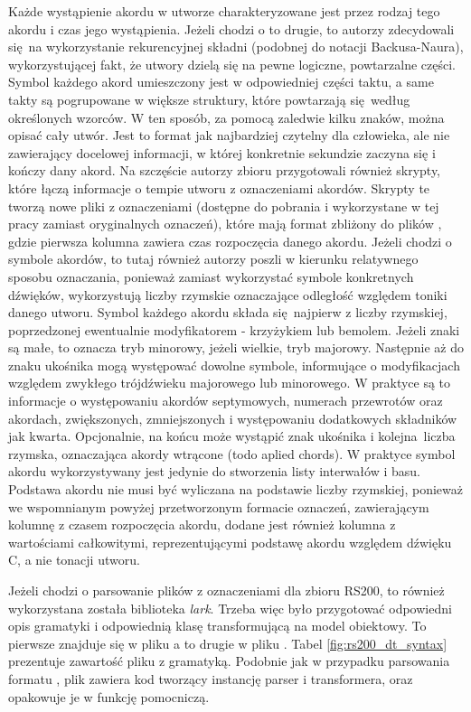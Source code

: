 Każde wystąpienie akordu w utworze charakteryzowane jest przez rodzaj tego akordu i czas jego
wystąpienia. Jeżeli chodzi o to drugie, to autorzy zdecydowali się na wykorzystanie rekurencyjnej
składni (podobnej do notacji Backusa-Naura), wykorzystującej fakt, że utwory dzielą się na pewne
logiczne, powtarzalne części. Symbol każdego akord umieszczony jest w odpowiedniej części taktu, a
same takty są pogrupowane w większe struktury, które powtarzają się według określonych wzorców. W
ten sposób, za pomocą zaledwie kilku znaków, można opisać cały utwór. Jest to format jak najbardziej
czytelny dla człowieka, ale nie zawierający docelowej informacji, w której konkretnie sekundzie
zaczyna się i kończy dany akord. Na szczęście autorzy zbioru przygotowali również skrypty, które
łączą informacje o tempie utworu z oznaczeniami akordów. Skrypty te tworzą nowe pliki z oznaczeniami
(dostępne do pobrania i wykorzystane w tej pracy zamiast oryginalnych oznaczeń), które mają format
zbliżony do plików , gdzie pierwsza kolumna zawiera czas rozpoczęcia danego akordu. Jeżeli
chodzi o symbole akordów, to tutaj również autorzy poszli w kierunku relatywnego sposobu oznaczania,
ponieważ zamiast wykorzystać symbole konkretnych dźwięków, wykorzystują liczby rzymskie oznaczające
odległość względem toniki danego utworu.  Symbol każdego akordu składa się najpierw z liczby
rzymskiej, poprzedzonej ewentualnie modyfikatorem - krzyżykiem lub bemolem. Jeżeli znaki są małe, to
oznacza tryb minorowy, jeżeli wielkie, tryb majorowy. Następnie aż do znaku ukośnika mogą występować
dowolne symbole, informujące o modyfikacjach względem zwykłego trójdźwieku majorowego lub
minorowego. W praktyce są to informacje o występowaniu akordów septymowych, numerach przewrotów oraz
akordach, zwiększonych, zmniejszonych i występowaniu dodatkowych składników jak kwarta. Opcjonalnie,
na końcu może wystąpić znak ukośnika i kolejna liczba rzymska, oznaczająca akordy wtrącone (todo
aplied chords). W praktyce symbol akordu wykorzystywany jest jedynie do stworzenia listy interwałów
i basu.  Podstawa akordu nie musi być wyliczana na podstawie liczby rzymskiej, ponieważ we
wspomnianym powyżej przetworzonym formacie oznaczeń, zawierającym kolumnę z czasem rozpoczęcia
akordu, dodane jest również kolumna z wartościami całkowitymi, reprezentującymi podstawę akordu
względem dźwięku C, a nie tonacji utworu.

Jeżeli chodzi o parsowanie plików z oznaczeniami dla zbioru RS200, to również wykorzystana została
biblioteka \emph{lark}. Trzeba więc było przygotować odpowiedni opis gramatyki i odpowiednią klasę
transformującą na model obiektowy. To pierwsze znajduje się w pliku
 a to drugie w pliku
. Tabel \ref{fig:rs200_dt_syntax} prezentuje
zawartość pliku z gramatyką. Podobnie jak w przypadku parsowania formatu , plik
 zawiera kod tworzący instancję parser i transformera, oraz
opakowuje je w funkcję pomocniczą.

